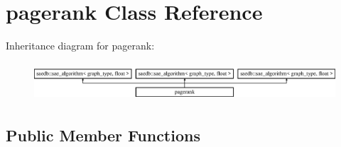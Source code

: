 \hypertarget{classpagerank}{\section{pagerank Class Reference}
\label{d7/d39/classpagerank}
}
Inheritance diagram for pagerank\-:\begin{figure}[H]
\begin{center}
\leavevmode
\includegraphics[height=1.441442cm]{d7/d39/classpagerank}
\end{center}
\end{figure}
\subsection*{Public Member Functions}
